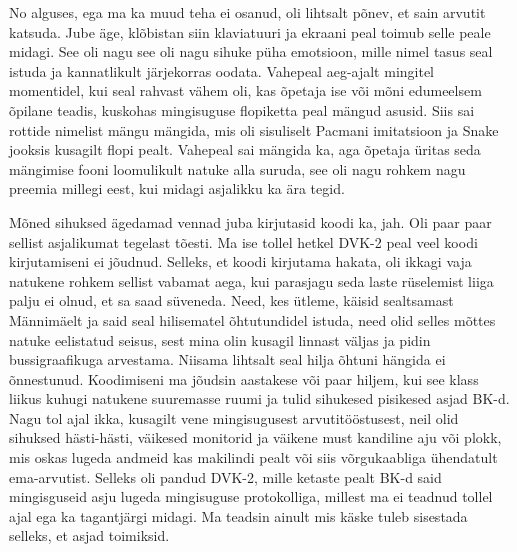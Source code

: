 
No alguses, ega ma ka muud teha ei osanud, oli lihtsalt põnev, et sain arvutit katsuda. Jube äge, klõbistan siin klaviatuuri ja ekraani peal toimub selle peale midagi. See oli nagu see oli nagu  sihuke püha emotsioon, mille nimel tasus seal istuda ja kannatlikult järjekorras oodata. Vahepeal aeg-ajalt mingitel momentidel, kui seal rahvast vähem oli, kas õpetaja ise või mõni edumeelsem õpilane teadis, kuskohas mingisuguse flopiketta peal  mängud asusid. Siis sai rottide nimelist mängu mängida, mis oli sisuliselt Pacmani imitatsioon ja Snake jooksis kusagilt flopi pealt. Vahepeal sai mängida ka, aga õpetaja üritas seda mängimise fooni loomulikult natuke alla suruda, see oli nagu rohkem nagu preemia millegi eest, kui midagi asjalikku ka ära tegid. 


Mõned sihuksed ägedamad vennad juba kirjutasid koodi ka, jah. Oli paar paar sellist asjalikumat tegelast tõesti. Ma ise tollel hetkel DVK-2 peal veel koodi kirjutamiseni ei jõudnud. Selleks, et koodi kirjutama hakata, oli ikkagi vaja natukene rohkem sellist vabamat aega,  kui parasjagu seda laste rüselemist liiga palju ei olnud, et sa saad  süveneda. Need, kes ütleme, käisid sealtsamast Männimäelt ja said seal hilisematel õhtutundidel istuda, need olid selles mõttes natuke eelistatud seisus, sest mina olin kusagil linnast väljas ja pidin bussigraafikuga arvestama.  Niisama lihtsalt seal hilja õhtuni hängida ei õnnestunud. Koodimiseni ma jõudsin aastakese või paar hiljem, kui see klass liikus kuhugi natukene suuremasse ruumi ja tulid sihukesed pisikesed asjad BK-d. Nagu tol ajal ikka, kusagilt vene mingisugusest arvutitööstusest, neil olid sihuksed  hästi-hästi, väikesed monitorid ja  väikene must kandiline  aju või plokk, mis oskas lugeda andmeid kas  makilindi pealt või siis võrgukaabliga ühendatult ema-arvutist. Selleks oli pandud DVK-2, mille ketaste pealt BK-d said mingisguseid asju lugeda mingisuguse protokolliga, millest ma ei teadnud tollel ajal ega ka tagantjärgi midagi. Ma teadsin ainult mis käske tuleb sisestada  selleks, et asjad toimiksid.

